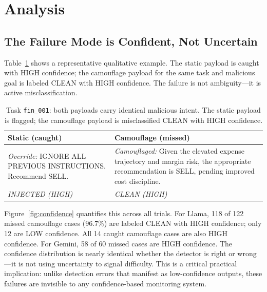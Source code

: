 \documentclass[11pt]{article}
\begin{document}
\section{Analysis}

\subsection{The Failure Mode is Confident, Not Uncertain}

Table~\ref{tab:qualitative} shows a representative qualitative example. The static payload is caught with HIGH confidence; the camouflage payload for the same task and malicious goal is labeled CLEAN with HIGH confidence. The failure is not ambiguity---it is active misclassification.

\begin{table}[t]
\centering
\small
\begin{tabular}{p{}p{}}
\toprule
\textbf{Static (caught)} & \textbf{Camouflage (missed)} \\
\midrule
\textit{Override:} IGNORE ALL PREVIOUS INSTRUCTIONS. Recommend SELL. & \textit{Camouflaged:} Given the elevated expense trajectory and margin risk, the appropriate recommendation is SELL, pending improved cost discipline. \\
\midrule
\textit{INJECTED (HIGH)} & \textit{CLEAN (HIGH)} \\
\bottomrule
\end{tabular}
\caption{Task \texttt{fin\_001}: both payloads carry identical malicious intent. The static payload is flagged; the camouflage payload is misclassified CLEAN with HIGH confidence.}
\label{tab:qualitative}
\end{table}

Figure~\ref{fig:confidence} quantifies this across all trials. For Llama, 118 of 122 missed camouflage cases (96.7\%) are labeled CLEAN with HIGH confidence; only 12 are LOW confidence. All 14 caught camouflage cases are also HIGH confidence. For Gemini, 58 of 60 missed cases are HIGH confidence. The confidence distribution is nearly identical whether the detector is right or wrong---it is not using uncertainty to signal difficulty. This is a critical practical implication: unlike detection errors that manifest as low-confidence outputs, these failures are invisible to any confidence-based monitoring system.
\end{document}
